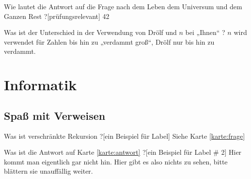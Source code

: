 \documentclass[a6paper]{kartei}
\begin{document}
	\begin{karte}[Lebensphilosophie]{Wie lautet die Antwort auf die Frage nach dem Leben dem Universum und dem Ganzen Rest ?}[prüfungsrelevant]
	42
	\end{karte}
	
 	\begin{karte}[Zahlenkunde]{Was ist der Unterschied in der Verwendung von Drölf und $n$ bei „Ihnen“ ?}
	$n$ wird verwendet für Zahlen bis hin zu „verdammt groß“, Drölf nur bis hin zu verdammt.
	\end{karte}
	\section*{Informatik}
	\subsection*{Spaß mit Verweisen}
	\renewcommand{\kommentarstil}{\textsc}
	\begin{karte}{Was ist verschränkte Rekursion ?}[ein Beispiel für Label]
	\label{karte:antwort} Siehe Karte \ref{karte:frage}
	\end{karte}

	\begin{karte}{Was ist die Antwort auf Karte \ref{karte:antwort} ?}[ein Beispiel für Label \# 2]
			Hier kommt man eigentlich gar nicht hin. Hier gibt es also nichts zu sehen, bitte blättern sie unauffällig weiter.
	\end{karte}
\end{document}
